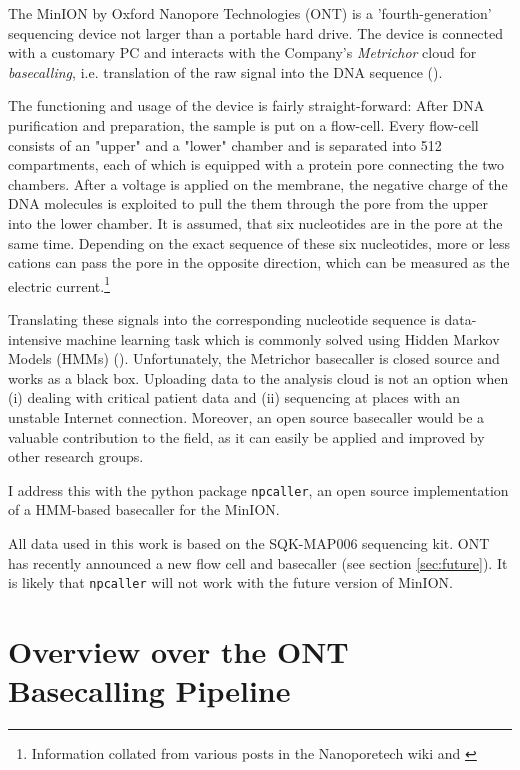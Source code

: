 \documentclass[]{scrartcl}
\begin{document}
The MinION by Oxford Nanopore Technologies (ONT) is a 'fourth-generation' sequencing device not larger than a portable hard drive. The device is connected with a customary PC and interacts with the Company's \textit{Metrichor} cloud for \textit{basecalling}, i.e. translation of the raw signal into the DNA sequence (\cite{Feng2015}). 

The functioning and usage of the device is fairly straight-forward: After DNA purification and preparation, the sample is put on a flow-cell. Every flow-cell consists of an "upper" and a "lower" chamber and is separated into 512 compartments, each of which is equipped with a protein pore connecting the two chambers. After a voltage is applied on the membrane, the negative charge of the DNA molecules is exploited to pull the them through the pore from the upper into the lower chamber. It is assumed, that six nucleotides are in the pore at the same time. Depending on the exact sequence of these six nucleotides, more or less cations can pass the pore in the opposite direction, which can be measured as the electric current.\footnote{Information collated from various posts in the Nanoporetech wiki and \cite{Feng2015}} 

Translating these signals into the corresponding nucleotide sequence is data-intensive machine learning task which is commonly solved using Hidden Markov Models (HMMs) (\cite{Timp2012a}). Unfortunately, the Metrichor basecaller is closed source and works as a black box. Uploading data to the analysis cloud is not an option when (i) dealing with critical patient data and (ii) sequencing at places with an unstable Internet connection. Moreover, an open source basecaller would be a valuable contribution to the field, as it can easily be applied and improved by other research groups.

I address this with the python package \texttt{npcaller}, an open source implementation of a HMM-based basecaller for the MinION. 

All data used in this work is based on the SQK-MAP006 sequencing kit. ONT has recently announced a new flow cell and basecaller (see section \ref{sec:future}). It is likely that \texttt{npcaller} will not work with the future version of MinION. 

\section{Overview over the ONT Basecalling Pipeline}
\end{document}
